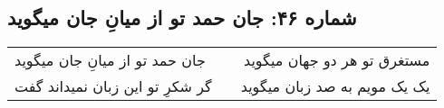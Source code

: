 \begin{center}
\section*{شماره ۴۶: جان حمد تو از میانِ جان میگوید}
\label{sec:046}
\begin{longtable}{l p{0.5cm} r}
جان حمد تو از میانِ جان میگوید
&&
مستغرق تو هر دو جهان میگوید
\\
گر شکرِ تو این زبان نمیداند گفت
&&
یک یک مویم به صد زبان میگوید
\\
\end{longtable}
\end{center}
